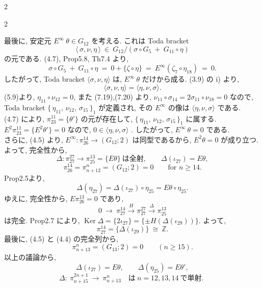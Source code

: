 \documentclass[10pt, leqno]{ltjsarticle}
\newcommand{\Ex}{E}        %
\newcommand{\todai}[2][]{\{\,#2\,\}_{#1}}      %
\newcommand{\gen}[1]{\{#1\}}       %
\newcommand{\Ker}{\operatorname{Ker}}
\newcommand{\pit}[2]{\pi_{#1}^{#2}}
\numberwithin{equation}{section}
\theoremstyle{plain}
\theoremstyle{definition}
\theoremstyle{remark}
\begin{document}
\begin{paracol}{2}
\end{paracol}

\begin{paracol}{2}

\noindent
最後に, 安定元 \(\Ex^\infty\ \theta\in G_{12}\) を考える. 
これは Toda bracket 
\[
\langle\,\sigma,\nu,\eta\,\rangle\ \in\
G_{12} / (\sigma\circ G_{5}\ +\ G_{11}\circ\eta)
\]
の元である. 
(4.7),  Prop5.8,  Th7.4 より, 
\[
\sigma\circ G_5\ +\ G_{11}\circ\eta
\ =\ 0+\{\zeta\circ\eta\}
\ =\ \Ex^\infty(\zeta_7\circ\eta_{18})\ =\ 0 .
\]
したがって, Toda bracket 
\(\langle \sigma,\nu,\eta\rangle\) 
は, \(E^\infty\ \theta\) だけから成る. 
(3.9) の i) より,  
\[
\langle \sigma,\nu,\eta\rangle=\langle \eta,\nu,\sigma\rangle.
\]
(5.9)より, 
\(\eta_{11}\circ\nu_{12}=0\), また (7.19),(7.20) より,
\(\nu_{11}\circ\sigma_{14}=2\sigma_{11}\circ\nu_{18}=0\) なので,\\
Toda bracket \(\todai[1]{\eta_{11},\,\nu_{12},\,\sigma_{15}}\) が定義され, 
その \(\Ex^\infty\) の像は \(\langle \eta,\nu,\sigma\rangle\) である.\\ 
(4.7) により, \(\pit{23}{11} = \gen{\theta'}\) の元が存在して, 
\(\todai[1]{\eta_{11},\,\nu_{12},\,\sigma_{15}}\) に属する. \\
\(E^2\pit{23}{11} = \gen{\Ex^{2}\theta'} = 0\) なので,
\(0 \in \langle \eta,\nu,\sigma\rangle\) . 
したがって, \(\Ex^\infty\ \theta = 0\) である.\\
さらに, (4.5) より, 
\(\Ex^\infty:\pit{26}{14}\to(G_{12};2)\) は同型であるから, 
\(\Ex^{2}\theta=0\) が成り立つ. \\
よって, 完全性から,
\[
\Delta:\pit{27}{27}\longrightarrow\pit{25}{13}=\gen{\Ex\theta}\ \text{は全射},\qquad
\Delta(\iota_{27})=\Ex\theta,
\]
\[
\pit{26}{14} = \pit{n+12}{n}
= (G_{12}; 2) = 0 \qquad \text{for } n \ge 14.
\]
Prop2.5より,
\[
\Delta(\eta_{27})=\Delta(\iota_{27})\circ\eta_{25}=\Ex\theta\circ\eta_{25}.
\]
ゆえに, 完全性から, \(\Ex\pit{26}{13}=0\) であり, 
\[
0\ \longrightarrow\ \pit{27}{14}\xrightarrow{\,H\,}\pit{27}{27}
\xrightarrow{\,\Delta\,}\pit{25}{13}
\]
は完全. Prop2.7 により,
\(\Ker \Delta = \gen{2\iota_{27}} 
= \gen{\pm H(\Delta(\iota_{29}))}\). よって,
\[
\pit{27}{14}=\gen{\Delta(\iota_{29})}\ \cong\ \mathbb{Z}.
\]
最後に, (4.5) と (4.4) の完全列から,
\[
\pit{n+13}{n}=(G_{13};2)=0\qquad (n\ge15).
\]
以上の議論から,
\begin{equation}
\Delta(\iota_{27})=\Ex\theta,\qquad
\Delta(\eta_{25})=\Ex\theta',
\end{equation}
\[
\Delta:\ \pit{n+15}{2n+1}\ \longrightarrow\ \pit{n+13}{n}
\quad\text{は}\ n=12,13,14\ \text{で単射. }
\]


\end{paracol}
\end{document}

